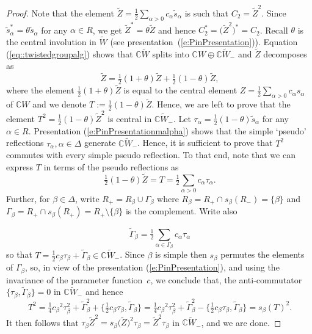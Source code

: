 \documentclass[10pt,a4paper]{amsart}
\numberwithin{equation}{section}
\begin{document}
\begin{proof}
Note that the element
$\tilde{Z} = \frac{1}{2} \sum_{\alpha >0} c_\alpha \tilde{s}_\alpha$ is such that $C_2 = \tilde{Z}^2$. Since $\tilde{s}_\alpha^* = \theta\tilde{s}_\alpha$ for any $\alpha\in R$, we get $\tilde{Z}^*=\theta\tilde{Z}$ and hence $C_2^* = \big(\tilde{Z}^2\big)^* = C_2$. Recall $\theta$ is the central involution in $\tilde{W}$ (see presentation~(\ref{e:PinPresentation})).
Equation (\ref{eq::twistedgroupalg}) shows that $\mathbb{C}\tilde{W}$ splits into $\mathbb{C}W \oplus \mathbb{C}\tilde{W}_-$ and $\tilde{Z}$ decomposes as
\[\tilde{Z} = \tfrac{1}{2}(1+\theta) \tilde{Z} + \tfrac{1}{2}(1-\theta) \tilde{Z},\]
where the element $ \frac{1}{2}(1
+\theta) \tilde{Z}$ is equal to the central element $Z = \frac{1}{2}\sum_{\alpha >0}c_\alpha s_\alpha$ of $ \mathbb{C}W$ and we denote $T:=\tfrac{1}{2}(1-\theta) \tilde{Z}$. Hence, we are left to prove that the element $T^2= \frac{1}{2}(1-\theta) \tilde{Z}^2$ is central in $\mathbb{C}\tilde{W}_-$. Let $\tau_\alpha = \frac{1}{2}(1-\theta)\tilde{s}_\alpha$ for any $\alpha \in R$. Presentation (\ref{e:PinPresentationmalpha}) shows that the simple `pseudo' reflections $\tau_\alpha, \alpha \in \Delta$ generate $\mathbb{C}\tilde{W}_-$. Hence, it is sufficient to prove that $T^2$ commutes with every simple pseudo reflection. To that end, note that we can express $T$ in terms of the pseudo reflections as
\[\tfrac{1}{2}(1-\theta) \tilde{Z} = T = \tfrac{1}{2}\sum_{\alpha >0} c_\alpha \tau_\alpha.
\]
Further, for $\beta \in \Delta$, write $R_+ = R_\beta \cup \Gamma_\beta$ where $R_\beta = R_+\cap s_\beta(R_-) = \{\beta\}$ and $\Gamma_\beta = R_+\cap s_\beta(R_+) = R_+ \setminus \{\beta\}$ is the complement. Write also

\begin{equation}\label{e:tildeZsums}
\tilde{\Gamma}_\beta = \tfrac{1}{2} \sum_{\alpha \in \Gamma_\beta} c_\alpha \tau_\alpha
\end{equation}
so that $T = \frac{1}{2}c_\beta \tau_\beta + \tilde{\Gamma}_\beta \in \mathbb{C} \tilde{W}_-$.
Since $\beta$ is simple then $s_\beta$ permutes the elements of $\Gamma_\beta$, so, in view of the presentation (\ref{e:PinPresentation}), and using the invariance of the parameter function~$c$, we conclude that, the anti-commutator $\big\{\tau_\beta,\tilde{\Gamma}_\beta\big\}= 0$ in $\mathbb{C}\tilde{W}_-$ and hence
\[
T^2 = \tfrac{1}{4}{c_\beta}^2\tau_\beta^2 + \tilde{\Gamma}_\beta^2 +\big\{\tfrac{1}{2}c_\beta\tau_\beta,\tilde{\Gamma}_\beta\big\}
= \tfrac{1}{4}{c_\beta}^2\tau_\beta^2 + \tilde{\Gamma}_\beta^2 - \big\{\tfrac{1}{2}c_\beta\tau_\beta,\tilde{\Gamma}_\beta\big\}
= s_\beta(T)^2.
\]
It then follows that $\tau_\beta \tilde{Z}^2 = s_\beta\big(\tilde{Z}\big)^2\tau_\beta = \tilde{Z}^2\tau_\beta$ in $\mathbb{C}\tilde{W}_-$, and we are done.
\end{proof}
\end{document}
